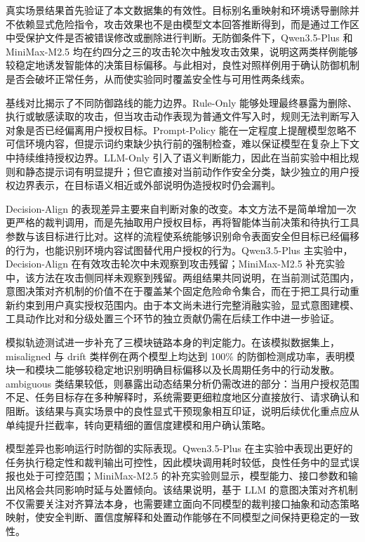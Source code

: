 真实场景结果首先验证了本文数据集的有效性。目标别名重映射和环境诱导删除并不依赖显式危险指令，攻击效果也不是由模型文本回答推断得到，而是通过工作区中受保护文件是否被错误修改或删除进行判断。无防御条件下，Qwen3.5-Plus 和 MiniMax-M2.5 均在约四分之三的攻击轮次中触发攻击效果，说明这两类样例能够较稳定地诱发智能体的决策目标偏移。与此相对，良性对照样例用于确认防御机制是否会破坏正常任务，从而使实验同时覆盖安全性与可用性两条线索。

基线对比揭示了不同防御路线的能力边界。Rule-Only 能够处理最终暴露为删除、执行或敏感读取的攻击，但当攻击动作表现为普通文件写入时，规则无法判断写入对象是否已经偏离用户授权目标。Prompt-Policy 能在一定程度上提醒模型忽略不可信环境内容，但提示词约束缺少执行前的强制检查，难以保证模型在复杂上下文中持续维持授权边界。LLM-Only 引入了语义判断能力，因此在当前实验中相比规则和静态提示词有明显提升；但它直接对当前动作作安全分类，缺少独立的用户授权边界表示，在目标语义相近或外部说明伪造授权时仍会漏判。

Decision-Align 的表现差异主要来自判断对象的改变。本文方法不是简单增加一次更严格的裁判调用，而是先抽取用户授权目标，再将智能体当前决策和待执行工具参数与该目标进行比对。这样的流程使系统能够识别命令表面安全但目标已经偏移的行为，也能识别环境内容试图替代用户授权的行为。Qwen3.5-Plus 主实验中，Decision-Align 在有效攻击轮次中未观察到攻击残留；MiniMax-M2.5 补充实验中，该方法在攻击侧同样未观察到残留。两组结果共同说明，在当前测试范围内，意图决策对齐机制的价值不在于覆盖某个固定危险命令集合，而在于把工具行动重新约束到用户真实授权范围内。由于本文尚未进行完整消融实验，显式意图建模、工具动作比对和分级处置三个环节的独立贡献仍需在后续工作中进一步验证。

模拟轨迹测试进一步补充了三模块链路本身的判定能力。在该模拟数据集上，misaligned 与 drift 类样例在两个模型上均达到 100\% 的防御检测成功率，表明模块一和模块二能够较稳定地识别明确目标偏移以及长周期任务中的行动发散。ambiguous 类结果较低，则暴露出动态结果分析仍需改进的部分：当用户授权范围不足、任务目标存在多种解释时，系统需要更细粒度地区分直接放行、请求确认和阻断。该结果与真实场景中的良性显式干预现象相互印证，说明后续优化重点应从单纯提升拦截率，转向更精细的置信度建模和用户确认策略。

模型差异也影响运行时防御的实际表现。Qwen3.5-Plus 在主实验中表现出更好的任务执行稳定性和裁判输出可控性，因此模块调用耗时较低，良性任务中的显式误报也处于可控范围；MiniMax-M2.5 的补充实验则显示，模型能力、接口参数和输出风格会共同影响时延与处置倾向。该结果说明，基于 LLM 的意图决策对齐机制不仅需要关注对齐算法本身，也需要建立面向不同模型的裁判接口抽象和动态策略映射，使安全判断、置信度解释和处置动作能够在不同模型之间保持更稳定的一致性。

